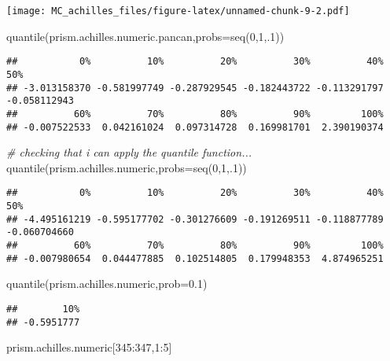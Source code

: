 \documentclass[
]{article}
\newenvironment{Shaded}{\begin{snugshade}}{\end{snugshade}}
\newcommand{\AttributeTok}[1]{\textcolor[rgb]{0.77,0.63,0.00}{#1}}
\newcommand{\CommentTok}[1]{\textcolor[rgb]{0.56,0.35,0.01}{\textit{#1}}}
\newcommand{\DecValTok}[1]{\textcolor[rgb]{0.00,0.00,0.81}{#1}}
\newcommand{\FloatTok}[1]{\textcolor[rgb]{0.00,0.00,0.81}{#1}}
\newcommand{\FunctionTok}[1]{\textcolor[rgb]{0.00,0.00,0.00}{#1}}
\newcommand{\NormalTok}[1]{#1}
\newcommand{\SpecialCharTok}[1]{\textcolor[rgb]{0.00,0.00,0.00}{#1}}
\begin{document}
\texttt{[image: MC\_achilles\_files/figure-latex/unnamed-chunk-9-2.pdf]}

\begin{Shaded}
\begin{Highlighting}[]
\FunctionTok{quantile}\NormalTok{(prism.achilles.numeric.pancan,}\AttributeTok{probs=}\FunctionTok{seq}\NormalTok{(}\DecValTok{0}\NormalTok{,}\DecValTok{1}\NormalTok{,.}\DecValTok{1}\NormalTok{))}
\end{Highlighting}
\end{Shaded}

\begin{verbatim}
##           0%          10%          20%          30%          40%          50% 
## -3.013158370 -0.581997749 -0.287929545 -0.182443722 -0.113291797 -0.058112943 
##          60%          70%          80%          90%         100% 
## -0.007522533  0.042161024  0.097314728  0.169981701  2.390190374
\end{verbatim}

\begin{Shaded}
\begin{Highlighting}[]
\CommentTok{\# checking that i can apply the quantile function...}
\FunctionTok{quantile}\NormalTok{(prism.achilles.numeric,}\AttributeTok{probs=}\FunctionTok{seq}\NormalTok{(}\DecValTok{0}\NormalTok{,}\DecValTok{1}\NormalTok{,.}\DecValTok{1}\NormalTok{))}
\end{Highlighting}
\end{Shaded}

\begin{verbatim}
##           0%          10%          20%          30%          40%          50% 
## -4.495161219 -0.595177702 -0.301276609 -0.191269511 -0.118877789 -0.060704660 
##          60%          70%          80%          90%         100% 
## -0.007980654  0.044477885  0.102514805  0.179948353  4.874965251
\end{verbatim}

\begin{Shaded}
\begin{Highlighting}[]
\FunctionTok{quantile}\NormalTok{(prism.achilles.numeric,}\AttributeTok{prob=}\FloatTok{0.1}\NormalTok{)}
\end{Highlighting}
\end{Shaded}

\begin{verbatim}
##        10% 
## -0.5951777
\end{verbatim}

\begin{Shaded}
\begin{Highlighting}[]
\NormalTok{prism.achilles.numeric[}\DecValTok{345}\SpecialCharTok{:}\DecValTok{347}\NormalTok{,}\DecValTok{1}\SpecialCharTok{:}\DecValTok{5}\NormalTok{]}
\end{Highlighting}
\end{Shaded}
\end{document}
